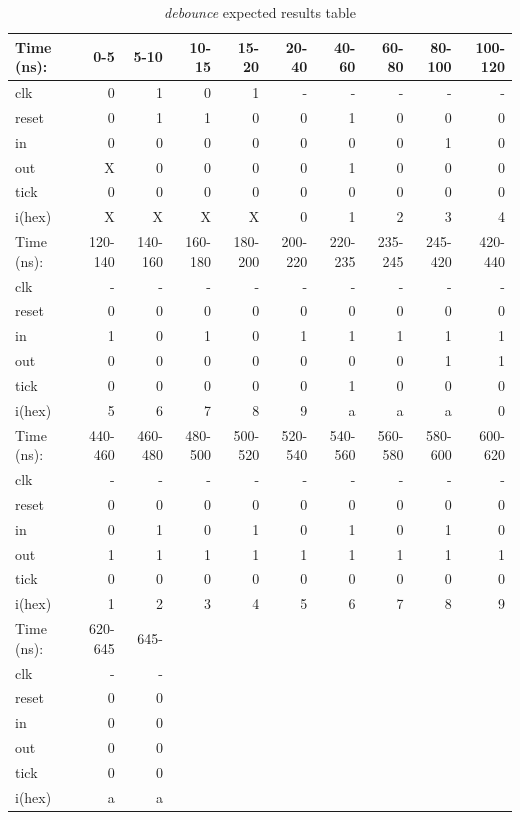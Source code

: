 \documentclass[11pt]{article}
\begin{document}
\begin{table}[ht]\centering
	\caption{\textit{debounce} expected results table}
	\label{ALU:tbl:alu_ERT}\medskip
	\begin{tabular}{l|rrrrrrrrr}
		Time (ns): & 0-5 & 5-10 & 10-15 & 15-20 & 20-40 & 40-60 & 60-80 & 80-100 & 100-120  \\
		\midrule
		clk & 0  & 1 & 0 & 1 & - & - & - & - & -   \\
		reset & 0 & 1 & 1 & 0 & 0 & 1 & 0 & 0 & 0 \\
		in & 0 & 0 & 0& 0 & 0 & 0 & 0 & 1 & 0   \\
		\midrule
		out & X & 0 & 0 & 0  & 0 & 1 & 0 & 0 & 0  \\
		tick & 0 & 0 & 0 & 0 & 0 & 0 & 0 & 0 & 0 \\
		i(hex) & X & X & X & X & 0 & 1 & 2 & 3 & 4 \\
		\midrule
		Time (ns): & 120-140 & 140-160 & 160-180 & 180-200 & 200-220 & 220-235 & 235-245 & 245-420 & 420-440   \\
		\midrule
		clk& - & - & - & - & -& - & - & - & - \\
		reset & 0 & 0 & 0 & 0 & 0 & 0 & 0 & 0 & 0 \\
		in & 1 & 0 & 1 & 0 & 1 & 1 & 1 & 1 & 1  \\
		\midrule
		out & 0 & 0 & 0 & 0 & 0 & 0 & 0 & 1 & 1  \\
		tick & 0 & 0 & 0 & 0 & 0 & 1 & 0 & 0 & 0 \\
		i(hex) & 5 & 6 & 7 & 8 & 9 & a & a & a & 0  \\
		\midrule
		Time (ns):& 440-460 & 460-480 & 480-500 & 500-520 & 520-540 & 540-560 & 560-580 & 580-600 & 600-620 \\
		\midrule
		clk & -  & - & - & - &- & - & - & - & -  \\
		reset & 0 & 0 & 0 & 0 & 0 & 0 & 0 & 0 & 0\\
		in & 0 & 1 & 0& 1 & 0 & 1 & 0 & 1 & 0 \\
		\midrule
		out & 1 & 1 & 1 & 1  & 1 & 1 & 1 & 1 & 1  \\
		tick & 0 & 0 & 0 & 0 & 0 & 0 & 0 & 0 & 0   \\
		i(hex) & 1 & 2 & 3 & 4 & 5 & 6 & 7 & 8 & 9 \\
		\midrule
		Time (ns): & 620-645 & 645-  \\
		\midrule
		clk & - & -  \\
		reset & 0 & 0  \\
		in & 0 & 0 \\
		\midrule
		out & 0 & 0   \\
		tick & 0 & 0   \\
		i(hex) & a & a\\
		\bottomrule
	\end{tabular}
\end{table}
\end{document}
